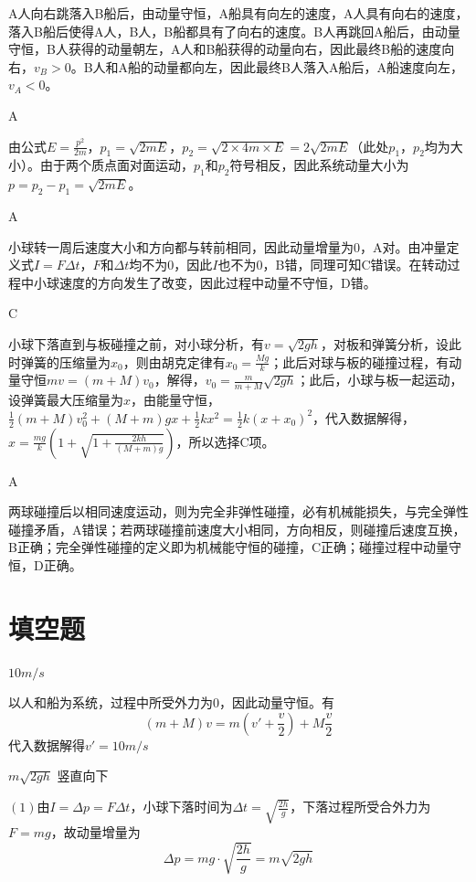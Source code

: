 \documentclass[b5paper,opensource]{qyxf-book}
\begin{document}
A人向右跳落入B船后，由动量守恒，A船具有向左的速度，A人具有向右的速度，落入B船后使得A人，B人，B船都具有了向右的速度。B人再跳回A船后，由动量守恒，B人获得的动量朝左，A人和B船获得的动量向右，因此最终B船的速度向右，\(v_B>0\)。B人和A船的动量都向左，因此最终B人落入A船后，A船速度向左，\(v_A<0\)。
			
A

由公式\(E=\frac{p^2}{2m}\)，\(p_1=\sqrt{2mE}\)，\(p_2=\sqrt{2\times 4m\times E}=2\sqrt{2mE}\)（此处\(p_1\)，\(p_2\)均为大小）。由于两个质点面对面运动，\(p_1\)和\(p_2\)符号相反，因此系统动量大小为\(p=p_2-p_1=\sqrt{2mE}\)。
			
A

小球转一周后速度大小和方向都与转前相同，因此动量增量为0，A对。由冲量定义式\(I=F\Delta t\)，\(F\)和\(\Delta t\)均不为0，因此\(I\)也不为0，B错，同理可知C错误。在转动过程中小球速度的方向发生了改变，因此过程中动量不守恒，D错。
			
C
			
小球下落直到与板碰撞之前，对小球分析，有\(v=\sqrt{2gh}\)，对板和弹簧分析，设此时弹簧的压缩量为\(x_0\)，则由胡克定律有\(x_0=\frac{Mg}{k}\)；此后对球与板的碰撞过程，有动量守恒\(mv=(m+M)v_0\)，解得，\(v_0=\frac{m}{m+M}\sqrt{2gh}\)；此后，小球与板一起运动，设弹簧最大压缩量为\(x\)，由能量守恒，\(\frac{1}{2}(m+M)v_0^2+(M+m)gx+\frac{1}{2}kx^2=\frac{1}{2}k(x+x_0)^2\)，代入数据解得，\(x=\frac{mg}{k}(1+\sqrt{1+\frac{2kh}{(M+m)g}})\)，所以选择C项。
			
A
			
两球碰撞后以相同速度运动，则为完全非弹性碰撞，必有机械能损失，与完全弹性碰撞矛盾，A错误；若两球碰撞前速度大小相同，方向相反，则碰撞后速度互换，B正确；完全弹性碰撞的定义即为机械能守恒的碰撞，C正确；碰撞过程中动量守恒，D正确。

\section{填空题}
$10m/s$

以人和船为系统，过程中所受外力为$ 0 $，因此动量守恒。有
\begin{equation*}
(m+M)v=m(v'+\frac{v}{2})+M\frac{v}{2} 
\end{equation*}
代入数据解得$ v'=10m/s $

$ m\sqrt{2gh} $ \hspace{4em} 竖直向下

$(1)$由$ I=\Delta p=F\Delta t $，小球下落时间为$\Delta t=\sqrt{\frac{2h}{g}}$，下落过程所受合外力为$F=mg$，故动量增量为
\begin{equation*}
\Delta p=mg\cdot\sqrt{\frac{2h}{g}}=m\sqrt{2gh}
\end{equation*}
\end{document}

